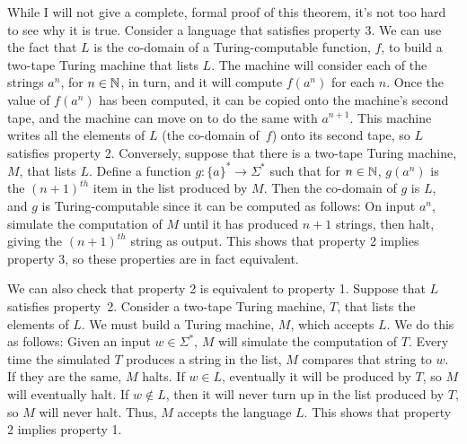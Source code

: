 While I will not give a complete, formal proof of this theorem, it's not
too hard to see why it is true.  Consider a language that satisfies
property 3.  We can use the fact that $L$ is the co-domain of a Turing-computable function, $f$,
to build a two-tape Turing machine that lists $L$.  The machine will
consider each of the strings $a^n$, for $n\in {\mathbb N}$, in turn, and it will compute
$f(a^n)$ for each $n$.  Once the value of $f(a^n)$ has been computed, it can be copied
onto the machine's second tape, and the machine can move on to do the same
with $a^{n+1}$.  This machine writes all the elements of $L$ 
(the co-domain of~$f$) onto its second tape,
so $L$ satisfies property 2.  Conversely, suppose that
there is a two-tape Turing machine, $M$, that lists $L$.  Define a function
$g\colon\{a\}^*\to\Sigma^*$ such that for $n\in{\mathbb N}$, $g(a^n)$ is the $(n+1)^{th}$ item in the
list produced by $M$.  Then the co-domain of $g$ is $L$, and $g$ is Turing-computable
since it can be computed as follows:  On input $a^n$, simulate the computation
of $M$ until it has produced $n+1$ strings, then halt, giving the $(n+1)^{th}$
string as output.  This shows that property 2 implies property 3, so these
properties are in fact equivalent.

We can also check that property 2 is equivalent to property 1. 
Suppose that $L$ satisfies property~2. Consider
a two-tape Turing machine, $T$, that lists the elements of $L$.  We must build
a Turing machine, $M$, which accepts $L$. We do this
as follows:  Given an input $w\in\Sigma^*$,
$M$ will simulate the computation of $T$.  Every time the simulated $T$ produces a string
in the list, $M$ compares that string to $w$.  If they are the same, $M$ halts.
If $w\in L$, eventually it will be produced by $T$, so $M$ will eventually halt.
If $w\not\in L$, then it will never turn up in the list produced by $T$, so
$M$ will never halt.  Thus, $M$ accepts the language $L$.  This shows that
property 2 implies property 1.  

